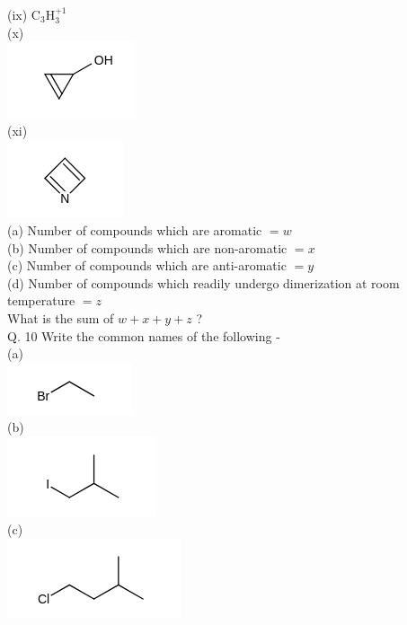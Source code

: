 \documentclass[10pt]{article}
\begin{document}
(ix) $\mathrm{C}_{3} \mathrm{H}_{3}^{+1}$\\
(x)\\
\includegraphics{smile-6f8aafb523ac0edb86c1b33cca73a9ccc14c17c8}\\
(xi)\\
\includegraphics{smile-608985decd624e1b3cd279d2615f0e3f201219d9}\\
(a) Number of compounds which are aromatic $=w$\\
(b) Number of compounds which are non-aromatic $=x$\\
(c) Number of compounds which are anti-aromatic $=y$\\
(d) Number of compounds which readily undergo dimerization at room temperature $=z$\\
What is the sum of $w+x+y+z$ ?\\
Q. 10 Write the common names of the following -\\
(a)\\
\includegraphics{smile-378542a9b0a9fb50836b6059966f9d56271bf28b}\\
(b)\\
\includegraphics{smile-8d6e49755da138a803b48afe9ad4d823ce94505a}\\
(c)\\
\includegraphics{smile-999ebfa776678592364c281d793332b7129670b7}\\
\end{document}
